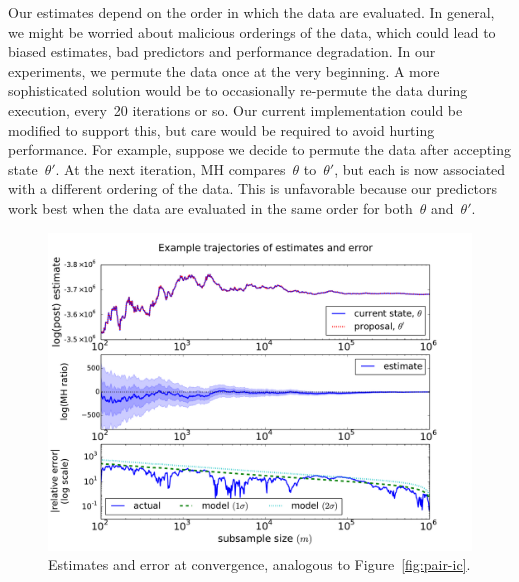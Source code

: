 \documentclass[angelino.tex]{subfiles}
\begin{document}
Our estimates depend on the order in which the data are evaluated.
In general, we might be worried about malicious orderings of the data,
which could lead to biased estimates, bad predictors and performance degradation.
In our experiments, we permute the data once at the very beginning.
A more sophisticated solution would be to occasionally re-permute the data
during execution, \eg every~20 iterations or so.
Our current implementation could be modified to support this,
but care would be required to avoid hurting performance.
For example, suppose we decide to permute the data after accepting state~$\theta'$.
At the next iteration, MH compares~$\theta$ to~$\theta'$,
but each is now associated with a different ordering of the data.
This is unfavorable because our predictors work best when the data are
evaluated in the same order for both~$\theta$ and~$\theta'$.

\begin{figure}[t!]
\begin{center}
\includegraphics[width=\textwidth]{figs/mix-mle-traces-pair.pdf}
\end{center}
\caption{Estimates and error at convergence, analogous to Figure~\ref{fig:pair-ic}.}
\label{fig:pair-mle}
\end{figure}
\end{document}
